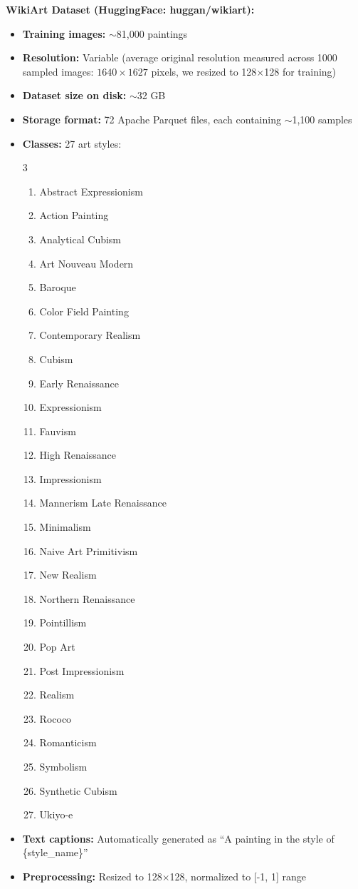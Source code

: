 \textbf{WikiArt Dataset (HuggingFace: huggan/wikiart):}
\begin{itemize}
    \item \textbf{Training images:} $\sim$81,000 paintings
    \item \textbf{Resolution:} Variable (average original resolution measured across 1000 sampled images: $1640 \times 1627$ pixels, we resized to 128$\times$128 for training)
    \item \textbf{Dataset size on disk:} $\sim$32 GB
    \item \textbf{Storage format:} 72 Apache Parquet files, each containing $\sim$1,100 samples
    \item \textbf{Classes:} 27 art styles:
    \begin{multicols}{3}
    \begin{enumerate}
        \item Abstract Expressionism
        \item Action Painting
        \item Analytical Cubism
        \item Art Nouveau Modern
        \item Baroque
        \item Color Field Painting
        \item Contemporary Realism
        \item Cubism
        \item Early Renaissance
        \item Expressionism
        \item Fauvism
        \item High Renaissance
        \item Impressionism
        \item Mannerism Late Renaissance
        \item Minimalism
        \item Naive Art Primitivism
        \item New Realism
        \item Northern Renaissance
        \item Pointillism
        \item Pop Art
        \item Post Impressionism
        \item Realism
        \item Rococo
        \item Romanticism
        \item Symbolism
        \item Synthetic Cubism
        \item Ukiyo-e
    \end{enumerate}
    \end{multicols}
    \item \textbf{Text captions:} Automatically generated as ``A painting in the style of \{style\_name\}''
    \item \textbf{Preprocessing:} Resized to 128$\times$128, normalized to [-1, 1] range
\end{itemize}


